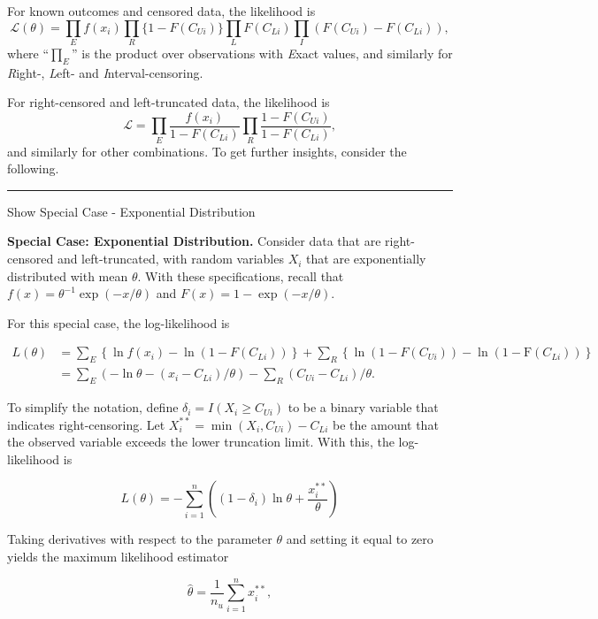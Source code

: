 \documentclass[]{book}
\theoremstyle{definition}
\theoremstyle{definition}
\theoremstyle{definition}
\theoremstyle{remark}
\begin{document}
For known outcomes and censored data, the likelihood is
\[\mathcal{L}(\theta) = \prod_{E} f(x_i) \prod_{R} \{1-F(C_{Ui})\} \prod_{L}
F(C_{Li}) \prod_{I} (F(C_{Ui})-F(C_{Li})),\] where ``\(\prod_{E}\)'' is
the product over observations with \emph{E}xact values, and similarly
for \emph{R}ight-, \emph{L}eft- and \emph{I}nterval-censoring.

For right-censored and left-truncated data, the likelihood is
\[\mathcal{L} = \prod_{E} \frac{f(x_i)}{1-F(C_{Li})} \prod_{R} \frac{1-F(C_{Ui})}{1-F(C_{Li})},\]
and similarly for other combinations. To get further insights, consider
the following.

\begin{center}\rule{0.5\linewidth}{\linethickness}\end{center}

Show Special Case - Exponential Distribution

\hypertarget{toggleExampleEXP}{}
\textbf{Special Case: Exponential Distribution.} Consider data that are
right-censored and left-truncated, with random variables \(X_i\) that
are exponentially distributed with mean \(\theta\). With these
specifications, recall that \(f(x) = \theta^{-1} \exp(-x/\theta)\) and
\(F(x) = 1-\exp(-x/\theta)\).

For this special case, the log-likelihood is

\[
\begin{aligned}
L(\theta) &= \sum_{E} \left\{ \ln f(x_i) - \ln (1-F(C_{Li})) \right\} + \sum_{R}\left\{ \ln (1-F(C_{Ui}))- \ln (1-\mathrm{F}(C_{Li})) \right\}\\
&= \sum_{E} (-\ln \theta -(x_i-C_{Li})/\theta ) -\sum_{R} (C_{Ui}-C_{Li})/\theta .
\end{aligned}
\]

To simplify the notation, define \(\delta_i = I(X_i \geq C_{Ui})\) to be
a binary variable that indicates right-censoring. Let
\(X_i^{\ast \ast} = \min(X_i, C_{Ui}) - C_{Li}\) be the amount that the
observed variable exceeds the lower truncation limit. With this, the
log-likelihood is

\begin{equation}
  L(\theta) =  - \sum_{i=1}^n ((1-\delta_i) \ln \theta + \frac{x_i^{\ast \ast}}{\theta})
  \label{eq:EXPloglik}
\end{equation}

Taking derivatives with respect to the parameter \(\theta\) and setting
it equal to zero yields the maximum likelihood estimator

\[\widehat{\theta}  = \frac{1}{n_u} \sum_{i=1}^n  x_i^{\ast \ast},\]
\end{document}
